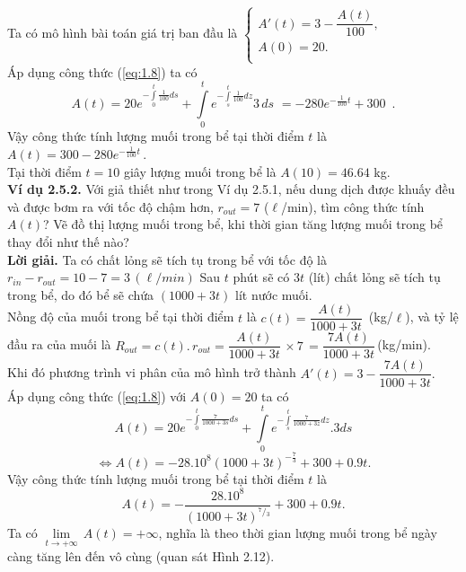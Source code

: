 Ta có mô hình bài toán giá trị ban đầu là    
$\left\{ \begin{array}{l}
	 {A}'(t)=3-\dfrac{A(t)}{100}, \\ 
	 A(0)=20. \\ 
\end{array} \right.$\\
Áp dụng công thức (\ref{eq:1.8}) ta có
$$A(t)=20{{e}^{-\int\limits_{0}^{t}{\frac{1}{100}ds}}}+\int\limits_{0}^{t}{{{e}^{-\int\limits_{s}^{t}{\frac{1}{100}dz}}}3}\,ds\,\,=-280{{e}^{-\frac{1}{100}t}}+300\,\,\,.$$
Vậy công thức tính lượng muối trong bể tại thời điểm $t$ là $A(t)=300-280{{e}^{-\frac{1}{100}t}}\,.$\\
Tại thời điểm $t=10$ giây lượng muối trong bể là  $A(10)=46.64$ kg.\\
\textbf{Ví dụ 2.5.2.} Với giả thiết như trong Ví dụ 2.5.1, nếu dung dịch được khuấy đều và  được bơm ra với tốc độ chậm hơn, ${{r}_{out}}=7$ ($\ell$/min), tìm công thức tính $A(t)$? Vẽ đồ thị lượng muối trong bể, khi thời gian tăng lượng muối trong bể thay đổi như thế nào?\\
\textbf{Lời giải.}  
Ta có chất lỏng sẽ tích tụ trong bể với tốc độ là ${{r}_{in}}-{{r}_{out}}=10-7=3\, (\ell/min)$
Sau $t$ phút sẽ có $3t$ (lít) chất lỏng sẽ tích tụ trong bể, do đó bể sẽ chứa $(1000 + 3t)$ lít  nước muối. \\
Nồng độ của muối trong bể tại thời điểm $t$ là   $c(t)=\dfrac{A(t)}{1000+3t}\,$ (kg/$\ell$), và tỷ lệ đầu ra của muối là ${{R}_{out}}=c(t).\,{{r}_{out}}=\dfrac{A(t)}{1000+3t}\,\times 7\,=\dfrac{7A(t)}{1000+3t}\,$(kg/min).\\
Khi đó phương trình vi phân của mô hình trở thành ${A}'(t)=3-\dfrac{7A(t)}{1000+3t}.$\\
Áp dụng công thức (\ref{eq:1.8}) với $A(0)=20$ ta có 
$$A(t)=20{{e}^{-\int\limits_{0}^{t}{\frac{7}{1000+3s}ds}}}+\int\limits_{0}^{t}{{{e}^{-\int\limits_{s}^{t}{\frac{7}{1000+3z}dz}}}}.3ds $$
	$$ \Leftrightarrow A(t)=-{{28.10}^{8}}{{(1000+3t)}^{-\frac{7}{3}}}+300+0.9t. $$
Vậy công thức tính lượng muối trong bể tại thời điểm $t$ là $$A(t)=-\dfrac{{{28.10}^{8}}}{{{(1000+3t)}^{{}^{7}/{}_{3}}}}+300+0.9t.$$
Ta có $\underset{t\to +\infty }{\mathop{\lim }}\,A(t)=+\infty $, nghĩa là theo thời gian lượng muối trong bể ngày càng tăng lên đến vô cùng (quan sát Hình 2.12).

